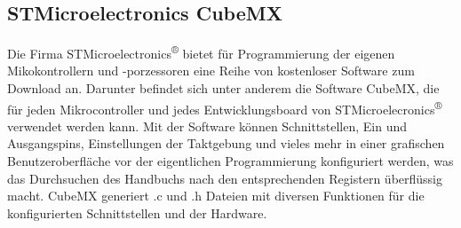 
\subsection{STMicroelectronics CubeMX}
Die Firma STMicroelectronics\textsuperscript{®} bietet für Programmierung der eigenen Mikokontrollern und -porzessoren eine Reihe von kostenloser Software zum Download an. Darunter befindet sich unter anderem die Software CubeMX, die für jeden Mikrocontroller und jedes Entwicklungsboard von STMicroelecronics\textsuperscript{®} verwendet werden kann. Mit der Software können Schnittstellen, Ein und Ausgangspins, Einstellungen der Taktgebung und vieles mehr in einer grafischen Benutzeroberfläche vor der eigentlichen Programmierung konfiguriert werden, was das Durchsuchen des Handbuchs nach den entsprechenden Registern überflüssig macht. CubeMX generiert .c und .h Dateien mit diversen Funktionen für die konfigurierten Schnittstellen und der Hardware. 

